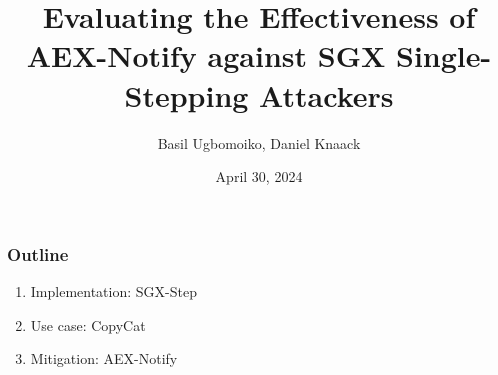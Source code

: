 \documentclass{beamer}
\title{Evaluating the Effectiveness of AEX-Notify against SGX Single-Stepping Attackers}
\author{Basil Ugbomoiko, Daniel Knaack}
\date{April 30, 2024}
\begin{document}
\begin{frame}
    \maketitle
\end{frame}

\begin{frame}
    \frametitle{Outline}
    \begin{enumerate}
        \item Implementation: SGX-Step
        \item Use case: CopyCat
        \item Mitigation: AEX-Notify
    \end{enumerate}
\end{frame}
\end{document}
